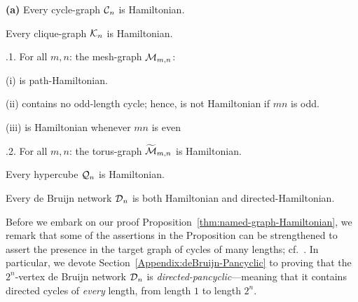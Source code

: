 \begin{prop}
\label{thm:named-graph-Hamiltonian}
\label{thm:deBruijn-Hamiltonian}
{\bf (a)}
Every cycle-graph $\mbox{$\cal C$}_n$ is Hamiltonian.

\smallskip

Every clique-graph $\mbox{$\cal K$}_n$ is Hamiltonian.

\smallskip

.1.
For all $m,n$: the mesh-graph $\mbox{$\cal M$}_{m,n}$:

(i)  is path-Hamiltonian.

(ii) contains no odd-length cycle; hence, is not Hamiltonian if $mn$ is odd.

(iii) is Hamiltonian whenever $mn$ is even 

\smallskip

.2.
For all $m,n$: the torus-graph $\widetilde{\mbox{$\cal M$}}_{m,n}$ is Hamiltonian.

\smallskip

Every hypercube $\mbox{$\cal Q$}_n$  is Hamiltonian.

\smallskip

Every de Bruijn network $\mbox{$\cal D$}_n$ is both Hamiltonian and directed-Hamiltonian.
\end{prop}
 
  

Before we embark on our proof Proposition~\ref{thm:named-graph-Hamiltonian}, we remark that some of the assertions in the Proposition can be strengthened to assert the presence in the target graph of cycles of many lengths; cf.~\cite{Rosenberg91}.  In particular, we devote Section~\ref{Appendix:deBruijn-Pancyclic} to proving that the $2^n$-vertex de Bruijn network $\mbox{$\cal D$}_n$ is {\it directed-pancyclic}---meaning that it contains directed cycles of {\em every} length, from length $1$ to length $2^n$.

